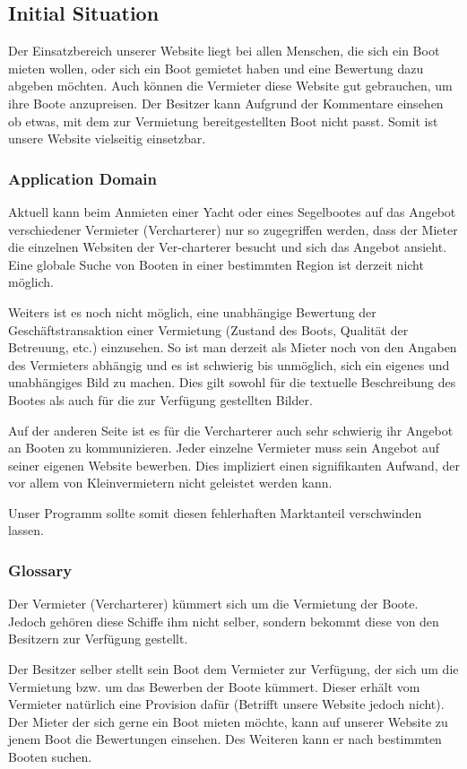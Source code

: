 \documentclass[12pt]{article}
\theoremstyle{definition}
\begin{document}
\subsection{Initial Situation}
	Der Einsatzbereich unserer Website liegt bei allen Menschen, die sich ein Boot mieten wollen, oder sich ein Boot gemietet haben und eine Bewertung dazu abgeben möchten.
	Auch können die Vermieter diese Website gut gebrauchen, um ihre Boote anzupreisen.
	Der Besitzer kann Aufgrund der Kommentare einsehen ob etwas, mit dem zur Vermietung bereitgestellten Boot nicht passt. Somit ist unsere Website vielseitig einsetzbar.	

\subsubsection{Application Domain}
	Aktuell kann beim Anmieten einer Yacht oder eines Segelbootes auf das Angebot verschiedener Vermieter (Vercharterer) nur so zugegriffen werden, dass der Mieter die einzelnen Websiten der Ver-charterer besucht und sich das Angebot ansieht. Eine globale Suche von Booten in einer bestimmten Region ist derzeit nicht möglich. 

	Weiters ist es noch nicht möglich, eine unabhängige Bewertung der Geschäfts\-trans\-aktion einer Vermietung (Zustand des Boots, Qualität der Betreuung, etc.) einzusehen. So ist man derzeit als Mieter noch von den Angaben des Vermieters abhängig und es ist schwierig bis unmöglich, sich ein eigenes und unabhängiges Bild zu machen. Dies gilt sowohl für die textuelle Beschreibung des Bootes als auch für die zur Verfügung gestellten Bilder.
	
	Auf der anderen Seite ist es für die Vercharterer auch sehr schwierig ihr Angebot an Booten zu kommunizieren. Jeder einzelne Vermieter muss sein Angebot auf seiner eigenen Website bewerben. Dies impliziert einen signifikanten Aufwand, der vor allem von Kleinvermietern nicht geleistet werden kann. 
	
	Unser Programm sollte somit diesen fehlerhaften Marktanteil verschwinden lassen.

\subsubsection{Glossary}
	Der Vermieter (Vercharterer) kümmert sich um die Vermietung der Boote. Jedoch gehören diese Schiffe ihm nicht selber, sondern bekommt diese von den Besitzern zur Verfügung gestellt.

	Der Besitzer selber stellt sein Boot dem Vermieter zur Verfügung, der sich um die Vermietung bzw. um das Bewerben der Boote kümmert. Dieser erhält vom Vermieter natürlich eine Provision dafür (Betrifft unsere Website jedoch nicht).
	Der Mieter der sich gerne ein Boot mieten möchte, kann auf unserer Website zu jenem Boot die Bewertungen einsehen. Des Weiteren kann er nach bestimmten Booten suchen.
\end{document}
